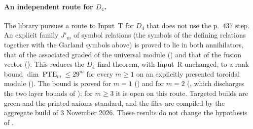 \paragraph{An independent route for $D_4$.} The library pursues a route to Input~T for $D_4$ that does not use the p.~437 step.
An explicit family $J'_m$ of symbol relations (the symbols of the defining relations together with the Garland symbols above) is
proved to lie in both annihilators, that of the associated graded of the universal module () and that of
the fusion vector (). This reduces the $D_4$ final theorem, with Input~R unchanged, to a rank bound
$\dim\operatorname{PTE}_m\le29^m$ for every $m\ge1$ on an explicitly presented toroidal module
(). The bound is proved for $m=1$ () and for
$m=2$ (, which discharges the two layer bounds of ); for $m\ge3$ it
is open on this route. Targeted builds are green and the printed axioms standard, and the files are compiled by the
aggregate build of 3 November 2026. These results do not change the hypothesis of .

